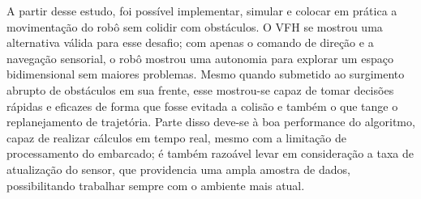 A partir desse estudo, foi possível implementar, simular e colocar 
em prática a movimentação do robô sem colidir com obstáculos. O VFH
se mostrou uma alternativa válida para esse desafio; com apenas o 
comando de direção e a navegação sensorial, o robô mostrou uma autonomia
para explorar um espaço bidimensional sem maiores problemas. Mesmo quando
submetido ao surgimento abrupto de obstáculos em sua frente, esse mostrou-se
capaz de tomar decisões rápidas e eficazes de forma que fosse evitada a
colisão e também o que tange o replanejamento de trajetória. Parte disso deve-se à
boa performance do algoritmo, capaz de realizar cálculos em tempo real, mesmo
com a limitação de processamento do embarcado; é também razoável levar em
consideração a taxa de atualização do sensor, que providencia uma ampla 
amostra de dados, possibilitando trabalhar sempre com o ambiente mais atual.
